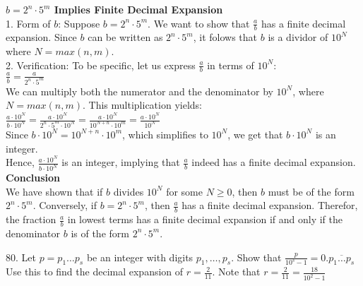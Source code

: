 \documentclass{article}
\begin{document}
\textbf{$b = 2^n \cdot 5^m$ Implies Finite Decimal Expansion}\\

1. Form of $b$: Suppose $b = 2^n \cdot 5^m$. We want to show that $\frac{a}{b}$ has a finite decimal expansion. Since $b$ can be written as $2^n \cdot 5^m$, it folows that $b$ is a dividor of $10^N$ where $N = max(n, m)$.\\

2. Verification: To be specific, let us express $\frac{a}{b}$ in terms of $10^N$:\\

	$\frac{a}{b} = \frac{a}{2^n \cdot 5^m}$\\

We can multiply both the numerator and the denominator by $10^N$, where $N = max(n, m)$. This multiplication yields:\\

	$\frac{a \cdot 10^N}{b \cdot 10^N} = \frac{a \cdot 10^N}{2^n \cdot 5^m \cdot 10^N} = \frac{a \cdot 10^N}{10^{N+n} \cdot 10^m} = \frac{a \cdot 10^N}{10^N}$\\

\noindent Since $b \cdot 10^N = 10^{N+n} \cdot 10^m$, which simplifies to $10^N$, we get that $b \cdot 10^N$ is an integer.\\
Hence, $\frac{a \cdot 10^N}{b \cdot 10^N}$ is an integer, implying that $\frac{a}{b}$ indeed has a finite decimal expansion.\\

\textbf{Conclusion}\\

We have shown that if $b$ divides $10^N$ for some $N \geq 0$, then $b$ must be of the form $2^n \cdot 5^m$. Conversely, if $b = 2^n \cdot 5^m$, then $\frac{a}{b}$ has a finite decimal expansion. Therefor, the fraction $\frac{a}{b}$ in lowest terms has a finite decimal expansion if and only if the denominator $b$ is of the form $2^n \cdot 5^m$.

\newpage

80. Let $p = p_1 \dots p_s$ be an integer with digits $p_1, \dots, p_s$. Show that $\frac{p}{10^s - 1} = 0.\overline{p_1 \dots p_s}$ Use this to find the decimal expansion of $r = \frac{2}{11}$. Note that $r = \frac{2}{11} = \frac{18}{10^2 - 1}$
\end{document}
